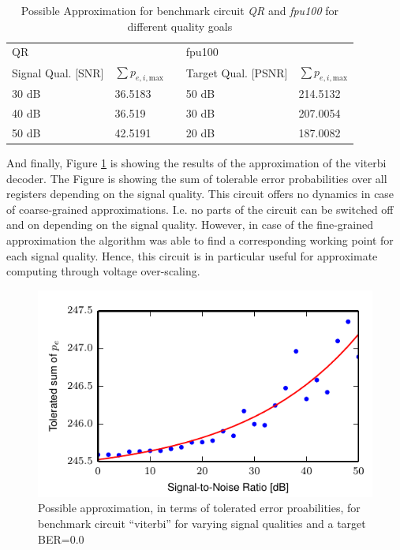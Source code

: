 \documentclass[conference]{IEEEtran}
\begin{document}
\begin{table}[htb]
\caption{Possible Approximation for benchmark circuit \emph{QR} and \emph{fpu100} for different quality goals}
\label{tab:approx}
\centering
\begin{tabular} { l  l  l  l  l }
\multicolumn{2}{l}{QR} & & \multicolumn{2}{l}{fpu100} \\
\cline{1-2} \cline{4-5}
Signal Qual. [SNR] & $\sum p_{e,i,\textrm{max}}$ & & Target Qual. [PSNR] & $\sum p_{e,i,\textrm{max}}$\\
\cline{1-2} \cline{4-5}
30 dB & 36.5183 & &50 dB & 214.5132 \\
40 dB & 36.519 & &30 dB & 207.0054 \\
50 dB & 42.5191 & &20 dB & 187.0082 \\

\hline



\end{tabular}
\end{table}

And finally, Figure \ref{fig:power_viterbi} is showing the results of the approximation of the viterbi decoder. The Figure is showing the sum of tolerable error probabilities over all registers depending on the signal quality. This circuit offers no dynamics in case of coarse-grained approximations. I.e. no parts of the circuit can be switched off and on depending on the signal quality. However, in case of the fine-grained approximation the algorithm was able to find a corresponding working point for each signal quality. Hence, this circuit is in particular useful for approximate computing through voltage over-scaling.
\begin{figure}[htb]
  \centering
  \includegraphics[width=.5\textwidth]{figs/optimization_viterbi}
  \caption{Possible approximation, in terms of tolerated error proabilities, for benchmark circuit ``viterbi'' for varying signal qualities and a target BER=$0.0$}
  \label{fig:power_viterbi}
\end{figure}
\end{document}
